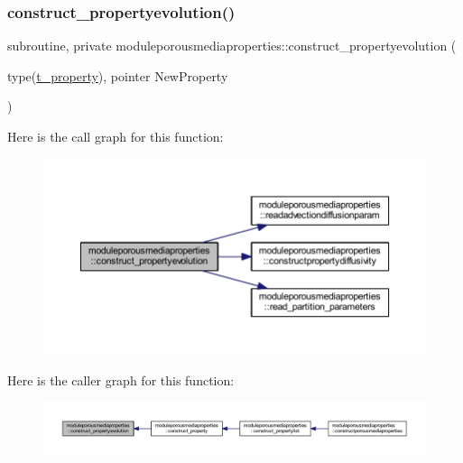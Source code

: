 \subsubsection{\texorpdfstring{construct\+\_\+propertyevolution()}{construct\_propertyevolution()}}
{\footnotesize\ttfamily subroutine, private moduleporousmediaproperties\+::construct\+\_\+propertyevolution (\begin{DoxyParamCaption}\item[{type(\mbox{\hyperlink{structmoduleporousmediaproperties_1_1t__property}{t\+\_\+property}}), pointer}]{New\+Property }\end{DoxyParamCaption})\hspace{0.3cm}{\ttfamily [private]}}

Here is the call graph for this function\+:\nopagebreak
\begin{figure}[H]
\begin{center}
\leavevmode
\includegraphics[width=350pt]{namespacemoduleporousmediaproperties_a7475f0f419f35758071e5f74d001e408_cgraph}
\end{center}
\end{figure}
Here is the caller graph for this function\+:\nopagebreak
\begin{figure}[H]
\begin{center}
\leavevmode
\includegraphics[width=350pt]{namespacemoduleporousmediaproperties_a7475f0f419f35758071e5f74d001e408_icgraph}
\end{center}
\end{figure}
\mbox{\label{namespacemoduleporousmediaproperties_a0b617f6e3c622010d4230970529e87fb}} 
